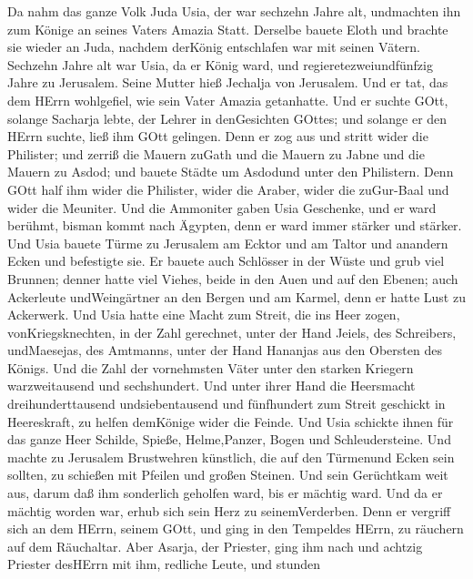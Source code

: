  Da nahm das ganze Volk Juda Usia, der war sechzehn Jahre
alt, undmachten ihn zum Könige an seines Vaters Amazia Statt.
 Derselbe bauete Eloth und brachte sie wieder an Juda,
nachdem derKönig entschlafen war mit seinen Vätern. 
Sechzehn Jahre alt war Usia, da er König ward, und
regieretezweiundfünfzig Jahre zu Jerusalem. Seine Mutter hieß Jechalja
von Jerusalem.  Und er tat, das dem HErrn wohlgefiel, wie
sein Vater Amazia getanhatte.  Und er suchte GOtt, solange
Sacharja lebte, der Lehrer in denGesichten GOttes; und solange er den
HErrn suchte, ließ ihm GOtt gelingen.  Denn er zog aus und
stritt wider die Philister; und zerriß die Mauern zuGath und die Mauern
zu Jabne und die Mauern zu Asdod; und bauete Städte um Asdodund unter
den Philistern.  Denn GOtt half ihm wider die Philister,
wider die Araber, wider die zuGur-Baal und wider die Meuniter.
 Und die Ammoniter gaben Usia Geschenke, und er ward
berühmt, bisman kommt nach Ägypten, denn er ward immer stärker und
stärker.  Und Usia bauete Türme zu Jerusalem am Ecktor und
am Taltor und anandern Ecken und befestigte sie.  Er bauete
auch Schlösser in der Wüste und grub viel Brunnen; denner hatte viel
Viehes, beide in den Auen und auf den Ebenen; auch Ackerleute
undWeingärtner an den Bergen und am Karmel, denn er hatte Lust zu
Ackerwerk.  Und Usia hatte eine Macht zum Streit, die ins
Heer zogen, vonKriegsknechten, in der Zahl gerechnet, unter der Hand
Jeiels, des Schreibers, undMaesejas, des Amtmanns, unter der Hand
Hananjas aus den Obersten des Königs.  Und die Zahl der
vornehmsten Väter unter den starken Kriegern warzweitausend und
sechshundert.  Und unter ihrer Hand die Heersmacht
dreihunderttausend undsiebentausend und fünfhundert zum Streit geschickt
in Heereskraft, zu helfen demKönige wider die Feinde.  Und
Usia schickte ihnen für das ganze Heer Schilde, Spieße, Helme,Panzer,
Bogen und Schleudersteine.  Und machte zu Jerusalem
Brustwehren künstlich, die auf den Türmenund Ecken sein sollten, zu
schießen mit Pfeilen und großen Steinen. Und sein Gerüchtkam weit aus,
darum daß ihm sonderlich geholfen ward, bis er mächtig ward.
 Und da er mächtig worden war, erhub sich sein Herz zu
seinemVerderben. Denn er vergriff sich an dem HErrn, seinem GOtt, und
ging in den Tempeldes HErrn, zu räuchern auf dem Räuchaltar.
 Aber Asarja, der Priester, ging ihm nach und achtzig
Priester desHErrn mit ihm, redliche Leute,  und stunden
